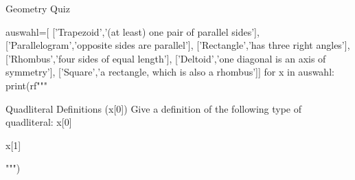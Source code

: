\documentclass[a4paper,10pt]{article}
\begin{document}
\begin{quiz}{Geometry Quiz}
\begin{python}
auswahl=[
  ['Trapezoid','(at least) one pair of parallel sides'],
  ['Parallelogram','opposite sides are parallel'],
  ['Rectangle','has three right angles'],
  ['Rhombus','four sides of equal length'],
  ['Deltoid','one diagonal is an axis of symmetry'],
  ['Square','a rectangle, which is also a rhombus']]
for x in auswahl:
  print(rf"""\begin{{essay}}[points=2, response format=html]{{Quadliteral Definitions ({x[0]})}}
  Give a definition of the following type of quadliteral: {x[0]}
  \item {x[1]}
  \end{{essay}}""")
\end{python}	
\end{quiz}
\end{document}
